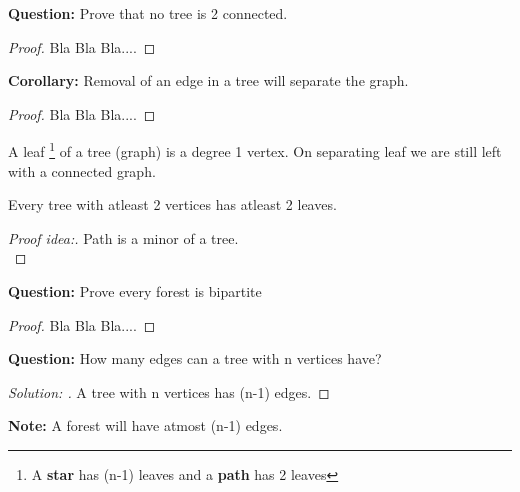 \documentclass{article}
\begin{document}
\begin{text}
{\textbf {Question: }Prove that no tree is 2 connected.}
    \begin{proof}
        Bla Bla Bla....       
    \end{proof}
\end{text}
\begin{text}
{\textbf {Corollary: }Removal of an edge in a tree will separate the graph.}
    \begin{proof}
        Bla Bla Bla....       
    \end{proof}
\end{text}
\begin{definition}
A leaf \footnote{A \textbf{star} has (n-1) leaves and a \textbf{path} has 2 leaves} of a tree (graph) is a degree 1 vertex. On separating leaf we are still left with a connected graph.
\end{definition}

\begin{theorem}
    Every tree with atleast 2 vertices has atleast 2 leaves.
    \begin{proof}[Proof idea:]
        Path is a minor of a tree. \\
    \end{proof}
\end{theorem}
\begin{text}
{\textbf {Question: }Prove every forest is bipartite}
    \begin{proof}
        Bla Bla Bla....       
    \end{proof}
\end{text}
\begin{text}
{\textbf {Question: }How many edges can a tree with n vertices have?}
    \begin{proof}[Solution: ]
        A tree with n vertices has (n-1) edges.       
    \end{proof}
    {\textbf {Note: }A forest will have atmost (n-1) edges.}
    
\end{text}
\end{document}
